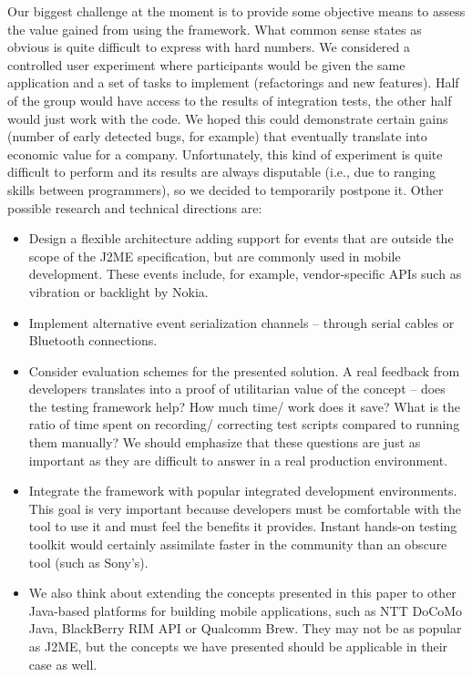 \documentclass{llncs}
\newcommand{\customtextsc}[1]{{\scriptsize \MakeUppercase{#1}}}
\newcommand{\acro}[1]{\customtextsc{#1}}   %
\newcommand{\jme}{\acro{j2me}}             %
\begin{document}
Our biggest challenge at the moment is to provide some objective means to assess the value gained from
using the framework. What common sense states as obvious is quite difficult to express
with hard numbers. We considered a controlled user experiment where participants would be
given the same application and a set of tasks to implement (refactorings and new features). Half of the group would have
access to the results of integration tests, the other half would just work with the code. We hoped this
could demonstrate certain gains (number of early detected bugs, for example) that eventually translate
into economic value for a company. Unfortunately, this kind of experiment is quite difficult to perform
and its results are always disputable (i.e., due to ranging skills between programmers), so we
decided to temporarily postpone it. Other possible research and technical directions are:
%
\begin{itemize}
    \item Design a flexible architecture adding support for events that are outside the scope
    of the \jme{} specification, but are commonly used in mobile development. These events include,
    for example, vendor-specific \acro{api}s such as vibration or backlight by Nokia.

	\item Implement alternative event serialization channels -- through serial cables or Bluetooth 
    connections.

    \item Consider evaluation schemes for the presented solution. A real feedback from
    developers translates into a proof of utilitarian value of the concept -- does the testing 
    framework help? How much time/ work does it save? What is the
    ratio of time spent on recording/ correcting test scripts compared to running them manually? We
    should emphasize that these questions are just as important as they are difficult to answer in a
    real production environment.

	\item Integrate the framework with popular integrated development environments. This
    goal is very important because developers must be comfortable with the tool to use it
    and must feel the benefits it provides. Instant hands-on testing toolkit would certainly assimilate
    faster in the community than an obscure tool (such as Sony's). 

	\item We also think about extending the concepts presented in this paper to other Java-based platforms 
    for building mobile applications, such as NTT DoCoMo Java, BlackBerry RIM API or Qualcomm Brew.
	 They may not be as popular as \jme{}, but the concepts we have presented should be applicable in
	 their case as well.
\end{itemize}
\end{document}
